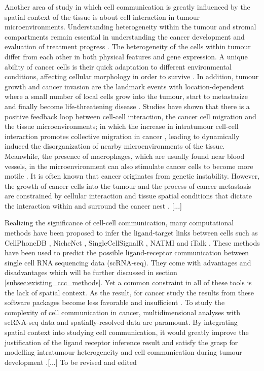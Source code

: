 Another area of study in which cell communication is greatly influenced by the spatial context of the tissue is about cell interaction in tumour microenvironments. Understanding heterogeneity within the tumour and stromal compartments remain essential in understanding the cancer development and evaluation of treatment progress \cite{pages2010immune}. The heterogeneity of the cells within tumour differ from each other in both physical features and gene expression. A unique ability of cancer cells is their quick adaptation to different environmental conditions, affecting cellular morphology in order to survive \cite{clark2015modes}. In addition, tumour growth and cancer invasion are the landmark events with location-dependent where a small number of local cells  grow into the tumour, start to metastasize and finally become life-threatening disease \cite{friedl2011cancer}. Studies have shown that there is a positive feedback loop between cell-cell interaction, the cancer cell migration and the tissue microenvironments; in which the increase in intratumour cell-cell interaction promotes collective migration in cancer \cite{friedl2011cancer, whiteside2008tumor}, leading to dynamically induced the disorganization of nearby microenvironments of the tissue\cite{friedl2012classifying, canel2013cadherin, almendro2013cellular, roussos2011chemotaxis, zervantonakis2012three}. Meanwhile, the presence of macrophages, which are usually found near blood vessels, in the microenvironment can also stimulate cancer cells to become more motile \cite{wyckoff2007direct}. It is often known that cancer originates from genetic instability. However, the growth of cancer cells into the tumour and the process of cancer metastasis are constrained by cellular interaction and tissue spatial conditions that dictate the interaction within and surround the cancer nest \cite{west2019cellular, liotta2001microenvironment,anderson2006tumor}. [...]

Realizing the significance of cell-cell communication, many computational methods have been proposed to infer the ligand-target links between cells such as CellPhoneDB \cite{efremova2020cellphonedb}, NicheNet \cite{browaeys2020nichenet}, SingleCellSignalR \cite{cabello2020singlecellsignalr}, NATMI \cite{hou2020predicting} and iTalk \cite{wang2019italk}. These methods have been  used to predict the possible ligand-receptor communication between single cell RNA sequencing data (scRNA-seq). They come with advantages and disadvantages which will be further discussed in section \ref{subsec:existing_ccc_methods}. Yet a common constraint in all of these tools is the lack of spatial context. As the result, for cancer study the results from these software packages become less favorable and insufficient \cite{de2020unraveling}. To study the complexity of cell communication in cancer, multidimensional analyses with scRNA-seq data and spatially-resolved data are paramount. By integrating spatial context into studying cell communication, it would greatly improve the justification of the ligand receptor inference result and satisfy the grasp for modelling intratumour heterogeneity and cell communication during tumour development \cite{crosetto2015spatially, pages2010immune, marusyk2012intra,bedard2013tumour}.[...] To be revised and edited  

